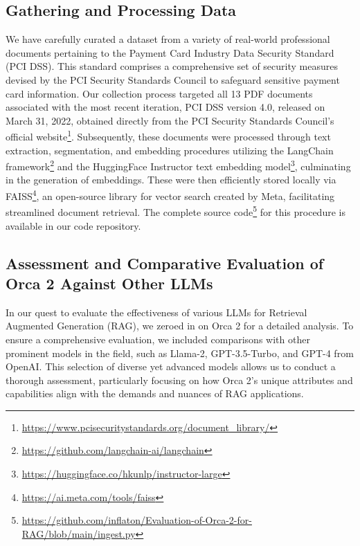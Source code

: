 \documentclass[runningheads]{llncs}
\begin{document}
\subsection{Gathering and Processing Data} 
\label{subsec:data}

We have carefully curated a dataset from a variety of real-world professional documents pertaining to the Payment Card Industry Data Security Standard (PCI DSS). This standard comprises a comprehensive set of security measures devised by the PCI Security Standards Council to safeguard sensitive payment card information. Our collection process targeted all 13 PDF documents associated with the most recent iteration, PCI DSS version 4.0, released on March 31, 2022, obtained directly from the PCI Security Standards Council's official website\footnote{\url{https://www.pcisecuritystandards.org/document\_library/}}. Subsequently, these documents were processed through text extraction, segmentation, and embedding procedures utilizing the LangChain framework\footnote{\url{https://github.com/langchain-ai/langchain}}  and the HuggingFace Instructor text embedding model\footnote{\url{https://huggingface.co/hkunlp/instructor-large}}, culminating in the generation of embeddings. These were then efficiently stored locally via FAISS\footnote{\url{https://ai.meta.com/tools/faiss}}, an open-source library for vector search created by Meta, facilitating streamlined document retrieval. The complete source code\footnote{\url{https://github.com/inflaton/Evaluation-of-Orca-2-for-RAG/blob/main/ingest.py}} for this procedure is available in our code repository.


\subsection{Assessment and Comparative Evaluation of Orca 2 Against Other LLMs}
In our quest to evaluate the effectiveness of various LLMs for Retrieval Augmented Generation (RAG), we zeroed in on Orca 2 for a detailed analysis. To ensure a comprehensive evaluation, we included comparisons with other prominent models in the field, such as Llama-2, GPT-3.5-Turbo, and GPT-4 from OpenAI. This selection of diverse yet advanced models allows us to conduct a thorough assessment, particularly focusing on how Orca 2's unique attributes and capabilities align with the demands and nuances of RAG applications.
\end{document}
